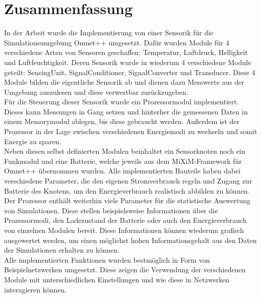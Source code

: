 \chapter{Zusammenfassung}

In der Arbeit wurde die Implementierung von einer Sensorik für die Simulationsumgebung Omnet++ umgesetzt. Dafür wurden Module für 4 verschiedene Arten von Sensoren geschaffen: Temperatur, Luftdruck, Helligkeit und Luftfeuchtigkeit. Deren Sensorik wurde in wiederum 4 verschiedene Module geteilt: SensingUnit, SignalConditioner, SignalConverter und Transducer. Diese 4 Module bilden die eigentliche Sensorik ab und dienen dazu Messwerte aus der Umgebung auszulesen und diese verwertbar zurückzugeben.\\
Für die Steuerung dieser Sensorik wurde ein Prozessormodul implementiert. Dieses kann Messungen in Gang setzen und hinterher die gemessenen Daten in einem Memorymodul ablegen, bis diese gebraucht werden. Außerdem ist der Prozessor in der Lage zwischen verschiedenen Energiemodi zu wechseln und somit Energie zu sparen.\\
Neben diesen selbst definierten Modulen beinhaltet ein Sensorknoten noch ein Funkmodul und eine Batterie, welche jeweils aus dem MiXiM-Framework für Omnet++ übernommen wurden. Alle implementierten Bauteile haben dabei verschiedene Parameter, die den eigenen Stromverbrauch regeln und Zugang zur Batterie des Knotens, um den Energieverbrauch realistisch abbilden zu können.\\
Der Prozessor enthält weiterhin viele Parameter für die statistische Auswertung von Simulationen. Diese stellen beispielsweise Informationen über die Prozessormodi, den Ladezustand der Batterie oder auch den Energieverbrauch von einzelnen Modulen bereit. Diese Informationen können wiederum grafisch ausgewertet werden, um einen möglichst hohen Informationsgehalt aus den Daten der Simulationen erhalten zu können.\\
Alle implementierten Funktionen wurden bestmöglich in Form von Beispielnetzwerken umgesetzt. Diese zeigen die Verwendung der verschiedenen Module mit unterschiedlichen Einstellungen und wie diese in Netzwerken interagieren können.\\
